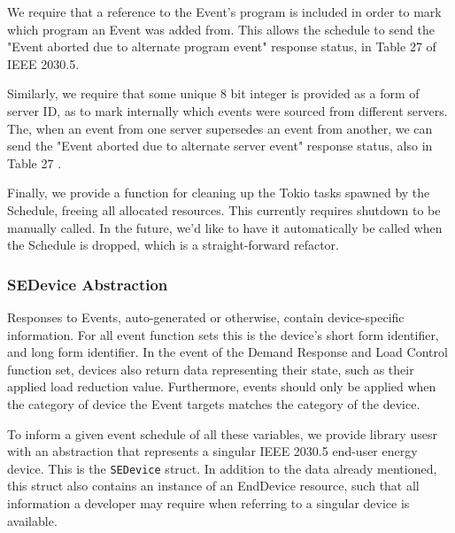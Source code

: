 We require that a reference to the Event's program is included in order to mark which program an Event was added from. This allows the schedule to send the "Event aborted due to alternate program event" response status, in Table 27 of IEEE 2030.5.

Similarly, we require that some unique 8 bit integer is provided as a form of server ID, as to mark internally which events were sourced from different servers. The, when an event from one server supersedes an event from another, we can send the "Event aborted due to alternate server event" response status, also in Table 27 \cite{IEEE2030.5}. 

Finally, we provide a function for cleaning up the Tokio tasks spawned by the Schedule, freeing all allocated resources. This currently requires shutdown to be manually called. In the future, we'd like to have it automatically be called when the Schedule is dropped, which is a straight-forward refactor.

\subsubsection{SEDevice Abstraction}

Responses to Events, auto-generated or otherwise, contain device-specific information. For all event function sets this is the device's short form identifier, and long form identifier. In the event of the Demand Response and Load Control function set, devices also return data representing their state, such as their applied load reduction value.
Furthermore, events should only be applied when the category of device the Event targets matches the category of the device.

To inform a given event schedule of all these variables, we provide library usesr with an abstraction that represents a singular IEEE 2030.5 end-user energy device. This is the \texttt{SEDevice} struct.
In addition to the data already mentioned, this struct also contains an instance of an EndDevice resource, such that all information a developer may require when referring to a singular device is available.

